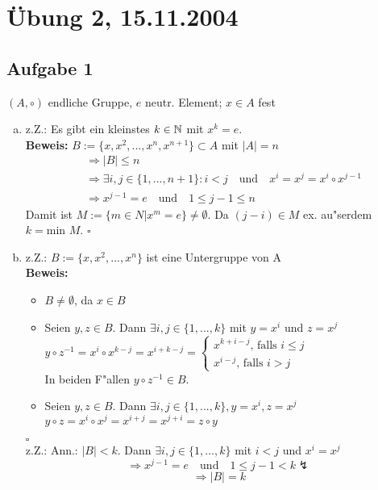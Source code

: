 \documentclass[a4paper,twoside,DIV15,BCOR12mm]{scrbook}
\newcommand{\enua}{\ \begin{enumerate}[a)]}
\newcommand{\une}{\end{enumerate}}
\newcommand{\RA}{\Rightarrow}
\newcommand{\error}{\lightning}
\newenvironment{bew}{\pagebreak[2]\textbf{Beweis: }}{\qed}
\renewcommand{\qed}{\hspace*{\fill} \ensuremath{\square}}
\begin{document}
\section{Übung 2, 15.11.2004}
\subsection{Aufgabe 1}
$(A,\circ)$ endliche Gruppe, $e$ neutr. Element; $x\in A$ fest
\enua
\item
z.Z.: Es gibt ein kleinstes $k\in\mathbb{N}$ mit $x^k=e$.\\
\begin{bew}
$B:=\{x,x^2,...,x^n,x^{n+1}\}\subset A$ mit $|A|=n$
\begin{align*}
&\RA |B|\le n\\
&\RA\exists i,j\in \{1,...,n+1\}: i<j\quad\mbox{und}\quad x^i=x^j=x^i\circ x^{j-1}\\
&\RA x^{j-1}=e\quad\mbox{und}\quad 1\le j-1\le n
\end{align*}
Damit ist $M:=\{m\in N|x^m=e\}\neq\emptyset$. Da $(j-i)\in M$ ex. au"serdem $k=\mbox{min }M$.
\end{bew}

\item
z.Z.: $B:=\{x,x^2,...,x^n\}$ ist eine Untergruppe von A\\
\begin{bew}\begin{itemize}
\item $B\neq\emptyset$, da $x\in B$
\item Seien $y,z\in B$. Dann $\exists i,j\in\{1,...,k\}$ mit $y=x^i$ und $z=x^j$\\
  $y\circ z^{-1}=x^i\circ x^{k-j}=x^{i+k-j}=
  \left\{
  \begin{array}{rcc}
    x^{k+i-j}\mbox{, falls }i\le j\\
    x^{i-j}\mbox{, falls }i>j
  \end{array}\right.$\\
  In beiden F"allen $y\circ z^{-1}\in B$.
\item Seien $y,z\in B$. Dann $\exists i,j\in \{1,...,k\}, y=x^i, z=x^j$\\
  $y\circ z=x^i\circ x^j=x^{i+j}=x^{j+i}=z\circ y$\par
\end{itemize}\end{bew}\\
z.Z.: Ann.: $|B|<k$. Dann $\exists i,j\in \{1,...,k\}$ mit $i<j$ und $x^i=x^j$
\[\RA x^{j-1}=e\quad\mbox{und}\quad 1\le j-1<k\error\]
\[\RA |B|=k\]
\une
\end{document}
